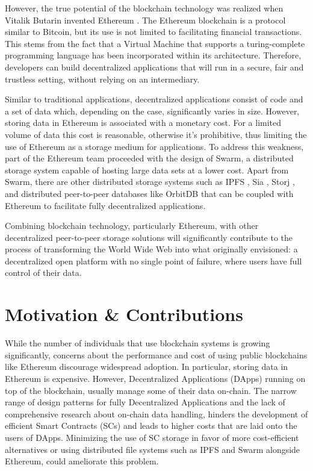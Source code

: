 However, the true potential of the blockchain technology was realized when Vitalik Butarin invented Ethereum \citep{buterin_2014}. The Ethereum blockchain is a protocol similar to Bitcoin, but its use is not limited to facilitating financial transactions. This stems from the fact that a Virtual Machine that supports a turing-complete programming language has been incorporated within its architecture. Therefore, developers can build decentralized applications that will run in a secure, fair and trustless setting, without relying on an intermediary. 

Similar to traditional applications, decentralized applications consist of code and a set of data which, depending on the case, significantly varies in size. However, storing data in Ethereum is associated with a monetary cost. For a limited volume of data this cost is reasonable, otherwise it's prohibitive, thus limiting the use of Ethereum as a storage medium for applications. To address this weakness, part of the Ethereum team proceeded with the design of Swarm, a distributed storage system capable of hosting large data sets at a lower cost. Apart from Swarm, there are other distributed storage systems such as IPFS \citep{benet_2014}, Sia \citep{vorick_2014}, Storj \citep{storjlabs_2018}, and distributed peer-to-peer databases like OrbitDB \citep{orbitdbwebsite_2023} that can be coupled with Ethereum to facilitate fully decentralized applications. 

Combining blockchain technology, particularly Ethereum, with other decentralized peer-to-peer storage solutions will significantly contribute to the process of transforming the World Wide Web into what \citet{berners-lee_2017} originally envisioned: a decentralized open platform with no single point of failure, where users have full control of their data. 

\section{Motivation \& Contributions}\label{sec:}
While the number of individuals that use blockchain systems is growing significantly, concerns about the performance and cost of using public blockchains like Ethereum \citep{buterin_2014} discourage widespread adoption. In particular, storing data in Ethereum is expensive. However, Decentralized Applications (DApps) running on top of the blockchain, usually manage some of their data on-chain. The narrow range of design patterns for fully Decentralized Applications \citep{wohrer_2021} and the lack of comprehensive research about on-chain data handling, hinders the development of efficient Smart Contracts (SCs) and leads to higher costs that are laid onto the users of DApps. Minimizing the use of SC storage in favor of more cost-efficient alternatives or using distributed file systems such as IPFS \citep{benet_2014} and Swarm \citep{tron_2020} alongside Ethereum, could ameliorate this problem.

